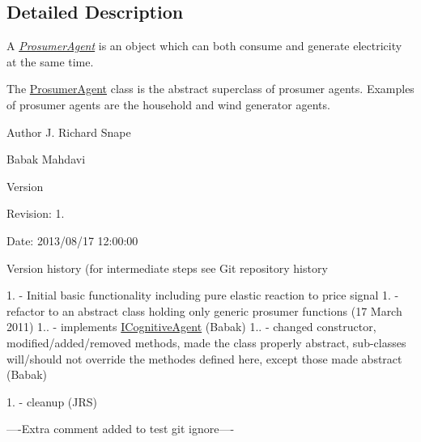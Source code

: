 \subsection{Detailed Description}
A {\itshape \hyperlink{classuk_1_1ac_1_1dmu_1_1iesd_1_1cascade_1_1agents_1_1prosumers_1_1_prosumer_agent}{Prosumer\-Agent}} is an object which can both consume and generate electricity at the same time. 

The {\ttfamily \hyperlink{classuk_1_1ac_1_1dmu_1_1iesd_1_1cascade_1_1agents_1_1prosumers_1_1_prosumer_agent}{Prosumer\-Agent}} class is the abstract superclass of prosumer agents. Examples of prosumer agents are the household and wind generator agents. 

\begin{DoxyAuthor}{Author}
J. Richard Snape 

Babak Mahdavi 
\end{DoxyAuthor}
\begin{DoxyVersion}{Version}

\end{DoxyVersion}
\begin{DoxyParagraph}{Revision\-:}
1. 
\end{DoxyParagraph}
\begin{DoxyParagraph}{Date\-:}
2013/08/17 12\-:00\-:00 
\end{DoxyParagraph}


Version history (for intermediate steps see Git repository history

1. -\/ Initial basic functionality including pure elastic reaction to price signal 1. -\/ refactor to an abstract class holding only generic prosumer functions (17 March 2011) 1.. -\/ implements \hyperlink{interfaceuk_1_1ac_1_1dmu_1_1iesd_1_1cascade_1_1agents_1_1_i_cognitive_agent}{I\-Cognitive\-Agent} (Babak) 1.. -\/ changed constructor, modified/added/removed methods, made the class properly abstract, sub-\/classes will/should not override the methodes defined here, except those made abstract (Babak)

1. -\/ cleanup (J\-R\-S) \begin{DoxyVerb}   ----Extra comment added to test git ignore----\end{DoxyVerb}
 

